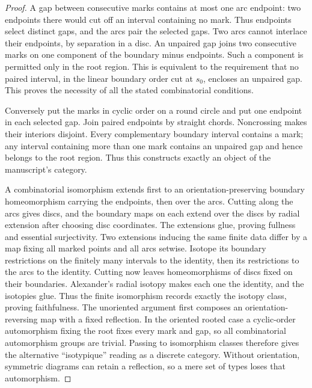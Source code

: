 \begin{proof}
A gap between consecutive marks contains at most one arc endpoint:
two endpoints there would cut off an interval containing no mark.
Thus endpoints select distinct gaps, and the arcs pair the selected gaps.
Two arcs cannot interlace their endpoints, by separation in a disc.
An unpaired gap joins two consecutive marks on one component of the
boundary minus endpoints. Such a component is permitted only in the root
region. This is equivalent to the requirement that no paired interval,
in the linear boundary order cut at $s_0$, encloses an unpaired gap.
This proves the necessity of all the stated combinatorial conditions.

Conversely put the marks in cyclic order on a round circle and put one
endpoint in each selected gap. Join paired endpoints by straight chords.
Noncrossing makes their interiors disjoint. Every complementary boundary
interval contains a mark; any interval containing more than one mark
contains an unpaired gap and hence belongs to the root region. Thus this
constructs exactly an object of the manuscript's category.

A combinatorial isomorphism extends first to an orientation-preserving
boundary homeomorphism carrying the endpoints, then over the arcs.
Cutting along the arcs gives discs, and the boundary maps on each extend
over the discs by radial extension after choosing disc coordinates.
The extensions glue, proving fullness and essential surjectivity.
Two extensions inducing the same finite data differ by a map fixing all
marked points and all arcs setwise. Isotope its boundary restrictions on
the finitely many intervals to the identity, then its restrictions to
the arcs to the identity. Cutting now leaves homeomorphisms of discs
fixed on their boundaries. Alexander's radial isotopy makes each one
the identity, and the isotopies glue. Thus the finite isomorphism records
exactly the isotopy class, proving faithfulness. The unoriented argument
first composes an orientation-reversing map with a fixed reflection.
In the oriented rooted case a cyclic-order automorphism fixing the root
fixes every mark and gap, so all combinatorial automorphism groups are
trivial. Passing to isomorphism classes therefore gives the alternative
``isotypique'' reading as a discrete category. Without orientation,
symmetric diagrams can retain a reflection, so a mere set of types loses
that automorphism.


\end{proof}
